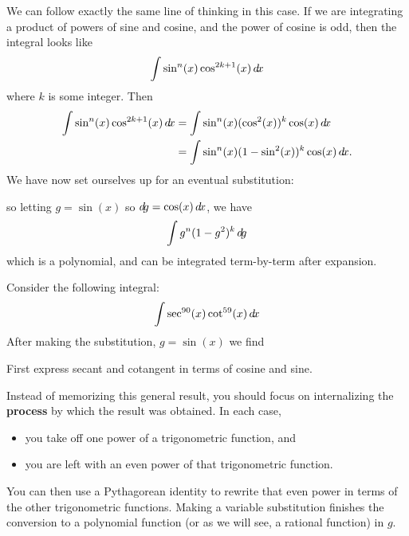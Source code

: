 \documentclass{ximera}
\begin{document}
We can follow exactly the same line of thinking in this case. If we
are integrating a product of powers of sine and cosine, and the power
of cosine is odd, then the integral looks like
\[
\int \sin^n(x) \cos^{2k+1}(x) \mathop{}\!d\! x
\]
where $k$ is some integer. Then
\begin{align*}
\int \sin^n(x) \cos^{2k+1}(x) \mathop{}\!d\! x &=\int \sin^n(x) (\cos^{2}(x))^k \cos(x)\mathop{}\!d\! x\\
&= \int \sin^n(x) (1-\sin^{2}(x))^k \cos(x) \mathop{}\!d\! x.
\end{align*}
We have now set ourselves up for an eventual substitution:
\begin{center}%
\end{center}
so letting $g = \sin(x)$ so $\mathop{}\!d\! g =\cos(x) \mathop{}\!d\! x$, we have 
\[
\int g^n(1-g^2)^k \mathop{}\!d\! g
\]
which is a polynomial, and can be integrated term-by-term after
expansion.

\begin{question}
  Consider the following integral:
  \[
  \int \sec^{90}(x) \cot^{59}(x)  \mathop{}\!d\! x
  \]
  After making the substitution, $g = \sin(x)$ we find
  \begin{hint}
    First express secant and cotangent in terms of cosine and sine.
  \end{hint}
  \begin{multipleChoice}
  \end{multipleChoice}
\end{question}


\begin{warning}
Instead of memorizing this general result, you should focus on
internalizing the \textbf{process} by which the result was obtained.
In each case,
\begin{itemize}
\item you take off one power of a trigonometric function, and
\item you are left with an even power of that trigonometric
  function.
\end{itemize}
You can then use a Pythagorean identity to rewrite that even power in
terms of the other trigonometric functions.  Making a variable
substitution finishes the conversion to a polynomial function (or as
we will see, a rational function) in $g$.
\end{warning}
\end{document}
